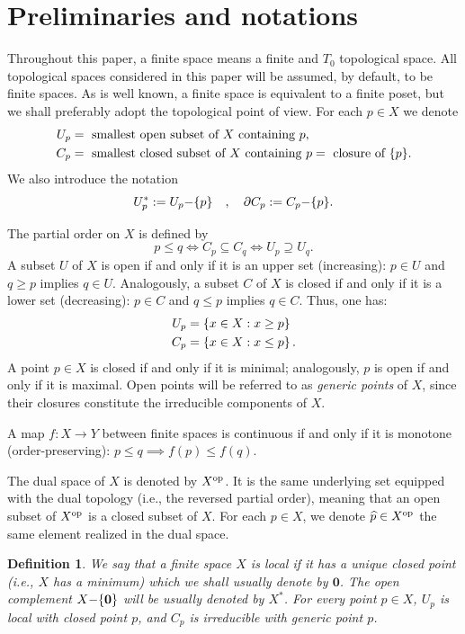 \documentclass[amssymb,amscd,11pt,20pt]{amsart}
\newcommand{\0}{\mathbf 0}
\newcommand{\wh}{\widehat}
\theoremstyle{plain}
\newtheorem{defn}[thm]{Definition}
\numberwithin{equation}{thm}
\begin{document}
\section{Preliminaries and notations}\label{prelim-section}

 Throughout this paper, a finite space means a finite and $T_0$ topological space. All topological spaces considered in this paper will be assumed, by default, to be finite spaces. As  is well known, a finite space is equivalent to a finite poset, but we shall preferably adopt the topological point of view. For each $p\in X$ we  denote
\[ \aligned U_p &=\text{ smallest open subset of } X \text{ containing } p, 
\\ C_p & = \text{ smallest closed subset of } X \text{ containing } p =\text{ closure of } \{p\}.\endaligned\]
We also introduce the notation $$U_p^*:=U_p\negmedspace - \negmedspace \{p\}\quad, \quad \partial C_p :=C_p\negmedspace - \negmedspace \{p\}.$$ 


The partial order on $X$ is defined by
\[p\leq q \Leftrightarrow C_p\subseteq C_q \Leftrightarrow U_p\supseteq U_q.\] A subset $U$ of $X$ is open if and only if it is an upper set (increasing): $p\in U$ and $q\geq p$ implies $q\in U$. Analogously, a subset $C$ of $X$ is closed if and only if it is a lower set (decreasing): $p\in C$ and $q\leq p$ implies $q\in C$. Thus, one has:
\[ \aligned U_p &=\left\{ x\in X: x\geq p\right\}  
\\ C_p &=\left\{ x\in X: x\leq p\right\}.\endaligned\] A point $p\in X$ is closed if and only if it is minimal; analogously, $p$ is open if and only if it is maximal. Open points will be referred to as {\em generic points} of $X$, since their closures constitute the irreducible components of $X$.

A map $f\colon X\to Y$ between finite spaces is continuous if and only if it is monotone (order-preserving): $p\leq q\implies f(p)\leq f(q)$. 

The dual space of $X$ is denoted by $X^{\text{\rm op}}$. It is the same underlying set equipped with the dual topology (i.e., the reversed partial order), meaning that  an open subset of $X^{\text{\rm op}}$ is a closed subset of $X$. For each $p\in X$, we  denote  $\wh p\in X^{\text{\rm op}}$ the same element realized in the dual space.

\begin{defn} {\rm We say that a finite space $X$ is {\em local} if it has a unique closed point (i.e., $X$ has a minimum) which we shall usually denote by $\0$. The open complement $X\negmedspace - \negmedspace\{\0\}$ will be usually denoted by $X^*$. For every point $p\in X$, $U_p$ is local  with closed point $p$, and $C_p$ is irreducible with generic point $p$.}
\end{defn}
\end{document}
